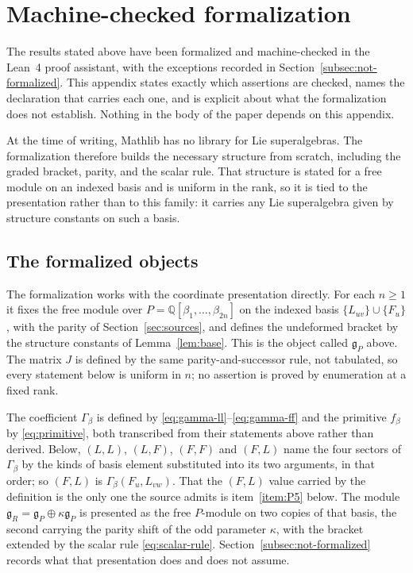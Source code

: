 \documentclass[11pt]{article}
\numberwithin{equation}{section}
\theoremstyle{remark}
\begin{document}
\appendix

\section{Machine-checked formalization}\label{sec:formalization}

The results stated above have been formalized and machine-checked in the Lean~4
proof assistant, with the exceptions recorded in
Section~\ref{subsec:not-formalized}. This appendix states exactly which
assertions are checked, names the declaration that carries each one, and is
explicit about what the formalization does not establish. Nothing in the
body of the paper depends on this appendix.

At the time of writing, Mathlib has no library for Lie superalgebras. The
formalization therefore builds the necessary structure from scratch, including
the graded bracket, parity, and the scalar rule. That structure is stated for a
free module on an indexed basis and is uniform in the rank, so it is tied to the
presentation rather than to this family: it carries any Lie superalgebra given
by structure constants on such a basis.

\subsection{The formalized objects}\label{subsec:formal-objects}

The formalization works with the coordinate presentation directly. For each
$n\geq1$ it fixes the free module over $P=\mathbb Q[\beta_1,\ldots,\beta_{2n}]$
on the indexed basis $\{L_{uv}\}\cup\{F_u\}$, with the parity of
Section~\ref{sec:sources}, and defines the undeformed bracket by the structure
constants of Lemma~\ref{lem:base}. This is the object called $\mathfrak g_P$
above. The matrix $J$ is defined by the same parity-and-successor rule, not
tabulated, so every statement below is uniform in $n$; no assertion is proved
by enumeration at a fixed rank.

The coefficient $\Gamma_\beta$ is defined by
\eqref{eq:gamma-ll}--\eqref{eq:gamma-ff} and the primitive $f_\beta$ by
\eqref{eq:primitive}, both transcribed from their statements above rather than
derived. Below, $(L,L)$, $(L,F)$, $(F,F)$ and $(F,L)$ name the four sectors of
$\Gamma_\beta$ by the kinds of basis element substituted into its two arguments,
in that order; so $(F,L)$ is $\Gamma_\beta(F_u,L_{vw})$. That the $(F,L)$ value
carried by the definition is the only one the source admits is
item~\ref{item:P5} below. The module $\mathfrak g_R=\mathfrak g_P\oplus\kappa\mathfrak g_P$ is
presented as the free $P$-module on two copies of that basis, the second
carrying the parity shift of the odd parameter $\kappa$, with the bracket
extended by the scalar rule \eqref{eq:scalar-rule}. Section~\ref{subsec:not-formalized}
records what that presentation does and does not assume.
\end{document}
